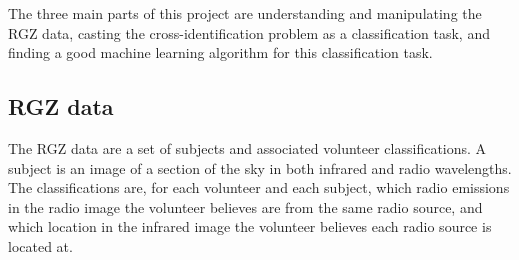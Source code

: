 \documentclass[a4paper]{article}
\begin{document}
    The three main parts of this project are understanding and manipulating the RGZ data, casting the cross-identification problem as a classification task, and finding a good machine learning algorithm for this classification task.

    \subsection*{RGZ data}

        The RGZ data are a set of subjects and associated volunteer classifications. A subject is an image of a section of the sky in both infrared and radio wavelengths. The classifications are, for each volunteer and each subject, which radio emissions in the radio image the volunteer believes are from the same radio source, and which location in the infrared image the volunteer believes each radio source is located at.
\end{document}

